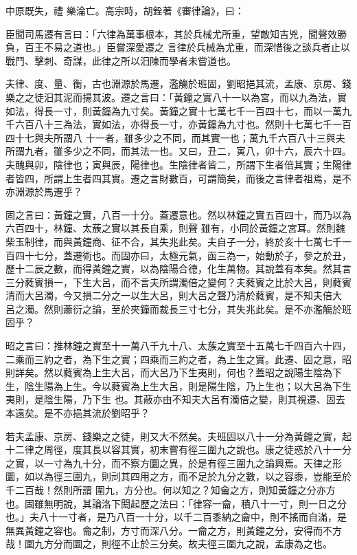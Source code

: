 
\begin{pinyinscope}

 中原既失，禮
 樂淪亡。高宗時，胡銓著《審律論》，曰：



 臣聞司馬遷有言曰：「六律為萬事根本，其於兵械尤所重，望敵知吉兇，聞聲效勝負，百王不易之道也。」臣嘗深愛遷之
 言律於兵械為尤重，而深惜後之談兵者止以戰鬥、擊刺、奇謀，此律之所以汨陳而學者未嘗道也。



 夫律、度、量、衡，古也淵源於馬遷，濫觴於班固，劉昭挹其流，孟康、京房、錢樂之之徒汨其泥而揚其波。遷之言曰：「黃鐘之實八十一以為宮，而以九為法，實如法，得長一寸，則黃鐘為九寸矣。黃鐘之實十七萬七千一百四十七，而以一萬九千六百八十三為法，實如法，亦得長一寸，亦黃鐘為九寸也。然則十七萬七千一百四十七與夫所謂八
 十一者，雖多少之不同，而其實一也；萬九千六百八十三與夫所謂九者，雖多少之不同，而其法一也。又曰，丑二，寅八，卯十六，辰六十四。夫醜與卯，陰律也；寅與辰，陽律也。生陰律者皆二，所謂下生者倍其實；生陽律者皆四，所謂上生者四其實。遷之言財數百，可謂簡矣，而後之言律者祖焉，是不亦淵源於馬遷乎？



 固之言曰：黃鐘之實，八百一十分。蓋遷意也。然以林鐘之實五百四十，而乃以為六百四十，林鐘、太蔟之實以其長自乘，則聲
 雖有，小同於黃鐘之宮耳。然則魏柴玉制律，而與黃鐘商、征不合，其失兆此矣。夫自子一分，終於亥十七萬七千一百四十七分，蓋遷術也。而固亦曰，太極元氣，函三為一，始動於子，參之於丑，歷十二辰之數，而得黃鐘之實，以為陰陽合德，化生萬物。其說蓋有本矣。然其言三分蕤賓損一，下生大呂，而不言夫所謂濁倍之變何？夫蕤賓之比於大呂，則蕤賓清而大呂濁，今又損二分之一以生大呂，則大呂之聲乃清於蕤賓，是不知夫倍大
 呂之濁。然則蕭衍之論，至於夾鐘而裁長三寸七分，其失兆此矣。是不亦濫觴於班固乎？



 昭之言曰：推林鐘之實至十一萬八千九十八、太蔟之實至十五萬七千四百六十四，二乘而三約之者，為下生之實；四乘而三約之者，為上生之實。此遷、固之意，昭則詳矣。然以蕤賓為上生大呂，而大呂乃下生夷則，何也？蓋昭之說陽生陰為下生，陰生陽為上生。今以蕤賓為上生大呂，則是陽生陰，乃上生也；以大呂為下生夷則，是陰生陽，乃下生
 也。其蔽亦由不知夫大呂有濁倍之變，則其視遷、固去本遠矣。是不亦挹其流於劉昭乎？



 若夫孟康、京房、錢樂之之徒，則又大不然矣。夫班固以八十一分為黃鐘之實，起十二律之周徑，度其長以容其實，初末嘗有徑三圍九之說也。康之徒惑於八十一分之實，以一寸為九十分，而不察方圜之異，於是有徑三圍九之論興焉。天律之形圜，如以為徑三圍九，則刓其四用之方，而不足於九分之數，以之容黍，豈能至於千二百哉！然則所謂
 圍九，方分也。何以知之？知龠之方，則知黃鐘之分亦方也。固雖無明說，其論洛下閎起歷之法曰：「律容一龠，積八十一寸，則一日之分也。」夫八十一寸者，是乃八百一十分，以千二百黍納之龠中，則不搖而自滿，是無異黃鐘之容也。龠之制，方寸而深八分。一龠之方，則黃鐘之分，安得而不方哉！圍九方分而圜之，則徑不止於三分矣。故夫徑三圍九之說，孟康為之也。




\end{pinyinscope}
